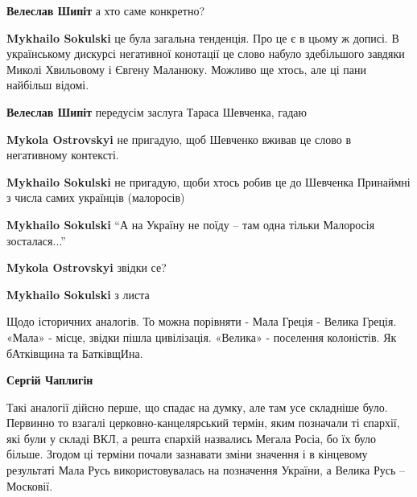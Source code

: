 \begin{itemize}
\begin{itemize}
\textbf{Велеслав Шипіт} а хто саме конкретно?

\textbf{Mykhailo Sokulski} це була загальна тенденція. Про це є в цьому ж дописі.
В українському дискурсі негативної конотації це слово набуло здебільшого завдяки Миколі Хвильовому і Євгену Маланюку. Можливо ще хтось, але ці пани найбільш відомі.

\textbf{Велеслав Шипіт} передусім заслуга Тараса Шевченка, гадаю

\textbf{Mykola Ostrovskyi} не пригадую, щоб Шевченко вживав це слово в негативному контексті.

\textbf{Mykhailo Sokulski} не пригадую, щоби хтось робив це до Шевченка
Принаймні з числа самих українців (малоросів)

\textbf{Mykhailo Sokulski} “А на Україну не поїду – там одна тільки Малоросія зосталася...”

\textbf{Mykola Ostrovskyi} звідки се?

\textbf{Mykhailo Sokulski} з листа

\end{itemize} %


Щодо історичних аналогів. То можна порівняти - Мала Греція - Велика Греція.
«Мала» - місце, звідки пішла цивілізація. «Велика» - поселення колоністів. Як
бАтківщина та БатківщИна.

\begin{itemize} %
\textbf{Сергій Чаплигін} 

Такі аналогії дійсно перше, що спадає на думку, але там усе складніше було.
Первинно то взагалі церковно-канцелярський термін, яким позначали ті єпархії,
які були у складі ВКЛ, а решта єпархій назвались Мегала Росіа, бо їх було
більше. Згодом ці терміни почали зазнавати зміни значення і в кінцевому
результаті Мала Русь використовувалась на позначення України, а Велика Русь --
Московії.

\end{itemize} %

\end{itemize} %

